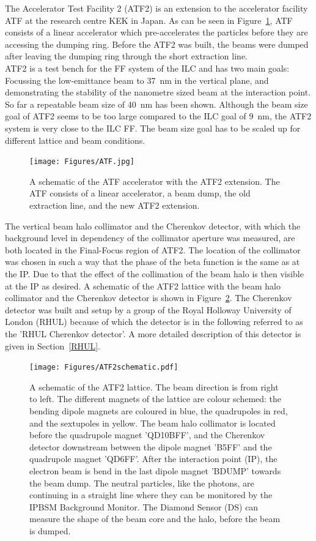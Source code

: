 The Accelerator Test Facility 2 (ATF2) is an extension to the accelerator facility ATF at the research centre KEK in Japan. As can be seen in Figure~\ref{fig:ATF}, ATF consists of a linear accelerator which pre-accelerates the particles before they are accessing the dumping ring. Before the ATF2 was built, the beams were dumped after leaving the dumping ring through the short extraction line.\\ATF2 is a test bench for the FF system of the ILC and has two main goals: Focussing the low-emittance beam to \SI{37}{\nano\metre} in the vertical plane, and demonstrating the stability of the nanometre sized beam at the interaction point. So far a repeatable beam size of \SI{40}{\nano\metre} has been shown. Although the beam size goal of ATF2 seems to be too large compared to the ILC goal of \SI{9}{\nano\metre}, the ATF2 system is very close to the ILC FF. The beam size goal has to be scaled up for different lattice and beam conditions.

\begin{figure}
\centering
\texttt{[image: Figures/ATF.jpg]}
\caption[ATF accelerator]{A schematic of the ATF accelerator with the ATF2 extension. The ATF consists of a linear accelerator, a beam dump, the old extraction line, and the new ATF2 extension.}%
\label{fig:ATF}
\end{figure}

The vertical beam halo collimator and the Cherenkov detector, with which the background level in dependency of the collimator aperture was measured, are both located in the Final-Focus region of ATF2. The location of the collimator was chosen in such a way that the phase of the beta function is the same as at the IP. Due to that the effect of the collimation of the beam halo is then visible at the IP as desired. A schematic of the ATF2 lattice with the beam halo collimator and the Cherenkov detector is shown in Figure~\ref{fig:ATF2}. The Cherenkov detector was built and setup by a group of the Royal Holloway University of London (RHUL) because of which the detector is in the following referred to as the 'RHUL Cherenkov detector'. A more detailed description of this detector is given in Section~\ref{RHUL}.

\begin{figure}
\centering
\texttt{[image: Figures/ATF2schematic.pdf]}
\caption[ATF2]{A schematic of the ATF2 lattice. The beam direction is from right to left. The different magnets of the lattice are colour schemed: the bending dipole magnets are coloured in blue, the quadrupoles in red, and the sextupoles in yellow. The beam halo collimator is located before the quadrupole magnet 'QD10BFF', and the Cherenkov detector downstream between the dipole magnet 'B5FF' and the quadrupole magnet 'QD6FF'. After the interaction point (IP), the electron beam is bend in the last dipole magnet 'BDUMP' towards the beam dump. The neutral particles, like the photons, are continuing in a straight line where they can be monitored by the IPBSM Background Monitor. The Diamond Sensor (DS) can measure the shape of the beam core and the halo, before the beam is dumped.}
\label{fig:ATF2}
\end{figure}

